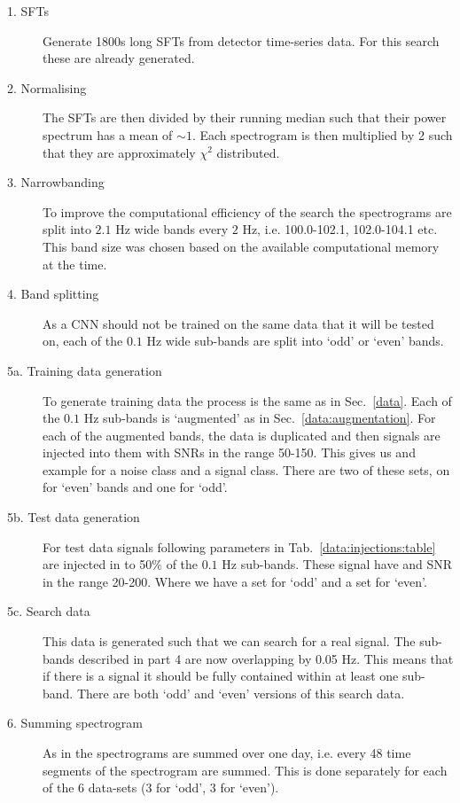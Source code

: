 \begin{description}
	\item[1. \acp{SFT}] Generate 1800s long \acp{SFT} from detector time-series data. For this search these are already generated.
	
	\item[2. Normalising] The \acp{SFT} are then divided by their running median such that their power spectrum has a mean of $\sim 1$. Each spectrogram is then multiplied by 2 such that they are approximately $\chi^{2}$ distributed.
	
	\item[3. Narrowbanding] To improve the computational efficiency of the search the spectrograms are split into 
	$2.1$ Hz wide bands every $2$ Hz,
	i.e. 100.0-102.1, 102.0-104.1 etc.
	This band size was chosen based on the available computational memory at the time.
	
	\item[4. Band splitting]  As a \ac{CNN} should not be trained on the same data that it will be tested on, each of the $0.1$ Hz wide sub-bands are split into `odd' or `even' bands. 
	
	\item[5a. Training data generation] To generate training data the
	process is the same as in Sec.~\ref{data}.  Each of the $0.1$ Hz sub-bands is `augmented' as in Sec.~\ref{data:augmentation}. For each of the augmented bands, the data is duplicated and then signals are injected into them with \acp{SNR} in the range 50-150. This gives us and example for a noise class and a signal class. There are two of these sets, on for `even' bands and one for `odd'.
	
	\item[5b. Test data generation] For test data signals following parameters in Tab.~\ref{data:injections:table} are injected in to 50\% of the $0.1$ Hz sub-bands. These signal have and \ac{SNR} in the range 20-200. Where we have a set for `odd' and a set for `even'.
	
	\item[5c. Search data] This data is generated such that we can search for a real signal. The sub-bands described in part 4 are now overlapping by 0.05 Hz. This means that if there is a signal it should be fully contained within at least one sub-band. There are both `odd' and `even' versions of this search data.
	
	\item[6. Summing spectrogram] As in \cite{bayley2019SOAPGeneralised} the spectrograms are summed over one day, i.e. every 48 time segments of the spectrogram are summed. This is done separately for each of the 6 data-sets (3 for `odd', 3 for `even'). 
	

\end{description}
